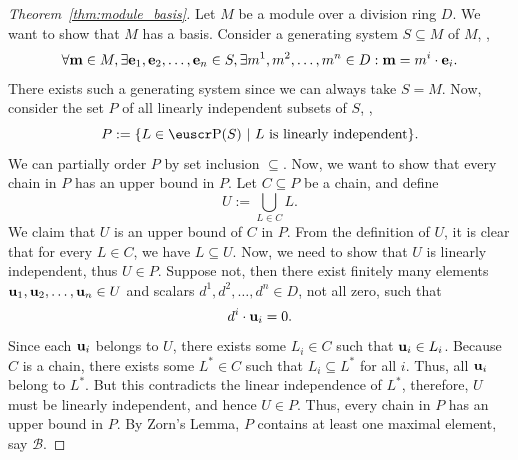 \begin{proof}[Theorem~\ref{thm:module_basis}]
	Let \(M\) be a module over a division ring \(D\). We want to show that \(M\) has a basis. Consider a generating system \(S \subseteq M\) of \(M\), \ie,
	\begin{equation}
		\forall \vb{m} \in M, \exists \vb{e}_1, \vb{e}_2, \ldots, \vb{e}_n \in S, \exists m^1, m^2, \ldots, m^n \in D: \vb{m} = m^i \cdot \vb{e}_i.
	\end{equation}
	There exists such a generating system since we can always take \(S = M\). Now, consider the set \(P\) of all linearly independent subsets of \(S\), \ie,
	\begin{equation}
		P := \qty{L \in \powerset(S) \mid L \text{ is linearly independent}}.
	\end{equation}
	We can partially order \(P\) by set inclusion \(\subseteq\). Now, we want to show that every chain in \(P\) has an upper bound in \(P\). Let \(C \subseteq P\) be a chain, and define
	\begin{equation}
		U := \bigcup_{L \in C} L.
	\end{equation}
	We claim that \(U\) is an upper bound of \(C\) in \(P\). From the definition of \(U\), it is clear that for every \(L \in C\), we have \(L \subseteq U\). Now, we need to show that \(U\) is linearly independent, thus \(U \in P\). Suppose not, then there exist finitely many elements \(\vb{u}_1, \vb{u}_2, \ldots, \vb{u}_n \in U\) and scalars \(d^1, d^2, \ldots, d^n \in D\), not all zero, such that
	\begin{equation}
		d^i \cdot \vb{u}_i = 0.
	\end{equation}
	Since each \(\vb{u}_i\) belongs to \(U\), there exists some \(L_i \in C\) such that \(\vb{u}_i \in L_i\). Because \(C\) is a chain, there exists some \(L^* \in C\) such that \(L_i \subseteq L^*\) for all \(i\). Thus, all \(\vb{u}_i\) belong to \(L^*\). But this contradicts the linear independence of \(L^*\), therefore, \(U\) must be linearly independent, and hence \(U \in P\). Thus, every chain in \(P\) has an upper bound in \(P\). By Zorn's Lemma, \(P\) contains at least one maximal element, say \(\mathcal{B}\).


\end{proof}
